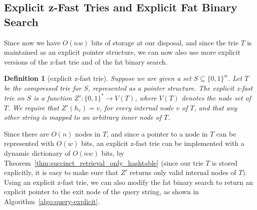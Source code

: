 \documentclass[a4paper,11pt]{article}
\newtheorem{definition}[theorem]{Definition}
\newcommand{\eps}{\varepsilon}
\newcommand{\?}{\mskip1.5mu}
\DeclareMathOperator{\exit}{exit}
\begin{document}
\subsection{Explicit z-Fast Tries and Explicit Fat Binary Search}

Since now we have $O(nw)$ bits of storage at our
disposal, and since the trie $T$ is maintained
as an explicit pointer structure, we can now
also use more explicit versions of the z-fast trie
and of the fat binary search.

\begin{definition}[explicit z-fast trie]
Suppose we are given a set $S \subseteq \{0, 1\}^w$. Let $T$ be the 
compressed trie for $S$, represented as a pointer structure. 
The \emph{explicit z-fast trie on $S$} is 
a function $Z' : \{0, 1\}^* \rightarrow V(T)$, where
$V(T)$ denotes the node set of $T$. We require that
$Z'(h_v) = v$, for every internal node $v$ of $T$,
and that any other string is mapped to an arbitrary
inner node of $T$.
\end{definition}

Since there are $O(n)$ nodes in $T$, and since a pointer
to a node in $T$ can be represented with $O(w)$ bits,
an explicit z-fast trie can be implemented with a dynamic
dictionary of $O(nw)$ bits, by 
Theorem~\ref{thm:succinct_retrieval_only_hashtable} (since
our trie $T$ is stored explicitly, it is easy to make
sure that $Z'$ returns only valid internal nodes
of $T$). Using
an explicit z-fast trie, we can also modify the fat binary
search to return an explicit pointer
to the exit node of the query string, 
as shown in Algorithm~\ref{algo:query-explicit}.

\begin{algorithm}
\KwOut{a pointer to $\exit(q)$}
\If{$a = 0 \wedge e_\text{root}\neq\eps$}{%
  \Return root of $T$\;
} 
\caption{Explicit fat binary search in order to 
  determine a pointer to $\exit(q)$.}
\label{algo:query-explicit}
\end{algorithm}
\end{document}
